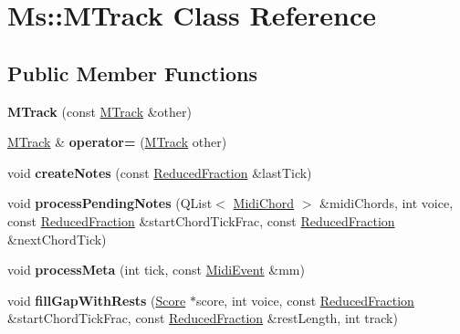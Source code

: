 \hypertarget{class_ms_1_1_m_track}{}\section{Ms\+:\+:M\+Track Class Reference}
\label{class_ms_1_1_m_track}
\subsection*{Public Member Functions}
\begin{DoxyCompactItemize}
\item 
\mbox{\label{class_ms_1_1_m_track_a6b07ee628fea7bcdb2cba12e67ca24fe}} 
{\bfseries M\+Track} (const \hyperlink{class_ms_1_1_m_track}{M\+Track} \&other)
\item 
\mbox{\label{class_ms_1_1_m_track_ad4ad65ee938aad16f4568c5868c8a839}} 
\hyperlink{class_ms_1_1_m_track}{M\+Track} \& {\bfseries operator=} (\hyperlink{class_ms_1_1_m_track}{M\+Track} other)
\item 
\mbox{\label{class_ms_1_1_m_track_a4c5c7570a6b4ddbb52a0fcc8f2baa476}} 
void {\bfseries create\+Notes} (const \hyperlink{class_ms_1_1_reduced_fraction}{Reduced\+Fraction} \&last\+Tick)
\item 
\mbox{\label{class_ms_1_1_m_track_abcae8ede750c205b80f05864f468bc88}} 
void {\bfseries process\+Pending\+Notes} (Q\+List$<$ \hyperlink{class_ms_1_1_midi_chord}{Midi\+Chord} $>$ \&midi\+Chords, int voice, const \hyperlink{class_ms_1_1_reduced_fraction}{Reduced\+Fraction} \&start\+Chord\+Tick\+Frac, const \hyperlink{class_ms_1_1_reduced_fraction}{Reduced\+Fraction} \&next\+Chord\+Tick)
\item 
\mbox{\label{class_ms_1_1_m_track_a2c0184f71227b248a39f6ed94fb9a5ca}} 
void {\bfseries process\+Meta} (int tick, const \hyperlink{class_ms_1_1_midi_event}{Midi\+Event} \&mm)
\item 
\mbox{\label{class_ms_1_1_m_track_a21ab2a26c4016276ff9ef4a583dd8fdf}} 
void {\bfseries fill\+Gap\+With\+Rests} (\hyperlink{class_ms_1_1_score}{Score} $\ast$score, int voice, const \hyperlink{class_ms_1_1_reduced_fraction}{Reduced\+Fraction} \&start\+Chord\+Tick\+Frac, const \hyperlink{class_ms_1_1_reduced_fraction}{Reduced\+Fraction} \&rest\+Length, int track)

\end{DoxyCompactItemize}
